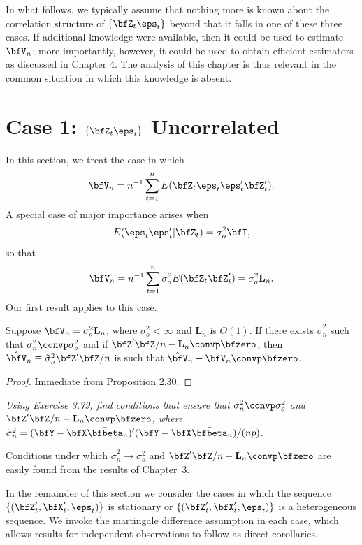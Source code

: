 In what follows, we typically assume that nothing more is known about the correlation structure of $\{\bfZ_t\eps_t\}$ beyond that it falls in one of these three cases. If additional knowledge were available, then it could be used to estimate $\bfV_n$; more importantly, however, it could be used to obtain efficient estimators as discussed in Chapter 4. The analysis of this chapter is thus relevant in the common situation in which this knowledge is absent.

\section{Case 1: \texorpdfstring{$\{\bfZ_t\eps_t\}$}{Zt et} Uncorrelated}\label{sec:case1}

In this section, we treat the case in which
\[
  \bfV_n = n^{-1}\sum_{t=1}^{n}E(\bfZ_t\eps_t\eps_t'\bfZ_t').
\]
A special case of major importance arises when
\[
  E(\eps_t\eps_t'|\bfZ_t) = \sigma_o^2\bfI,
\]
so that
\[
  \bfV_n = n^{-1}\sum_{t=1}^{n}\sigma_o^2 E(\bfZ_t\bfZ_t') = \sigma_o^2\mathbf{L}_n.
\]
Our first result applies to this case.

\begin{theorem}\label{thm:6.1}
Suppose $\bfV_n = \sigma_o^2\mathbf{L}_n$, where $\sigma_o^2 < \infty$ and $\mathbf{L}_n$ is $O(1)$. If there exists $\tilde{\sigma}_n^2$ such that $\tilde{\sigma}_n^2 \convp \sigma_o^2$ and if $\bfZ'\bfZ/n - \mathbf{L}_n \convp \bfzero$, then $\hat{\bfV}_n \equiv \tilde{\sigma}_n^2\bfZ'\bfZ/n$ is such that $\hat{\bfV}_n - \bfV_n \convp \bfzero$.
\end{theorem}

\begin{proof}
Immediate from Proposition 2.30.
\end{proof}

\begin{exercises}
\item\label{ex:6.2} \textit{Using Exercise 3.79, find conditions that ensure that $\tilde{\sigma}_n^2 \convp \sigma_o^2$ and $\bfZ'\bfZ/n - \mathbf{L}_n \convp \bfzero$, where $\tilde{\sigma}_n^2 = (\bfY - \bfX\bar{\bfbeta}_n)'(\bfY - \bfX\bar{\bfbeta}_n)/(np)$.}
\end{exercises}

Conditions under which $\tilde{\sigma}_n^2 \to \sigma_o^2$ and $\bfZ'\bfZ/n - \mathbf{L}_n \convp \bfzero$ are easily found from the results of Chapter~3.

In the remainder of this section we consider the cases in which the sequence $\{(\bfZ_t',\bfX_t',\eps_t)\}$ is stationary or $\{(\bfZ_t',\bfX_t',\eps_t)\}$ is a heterogeneous sequence. We invoke the martingale difference assumption in each case, which allows results for independent observations to follow as direct corollaries.

